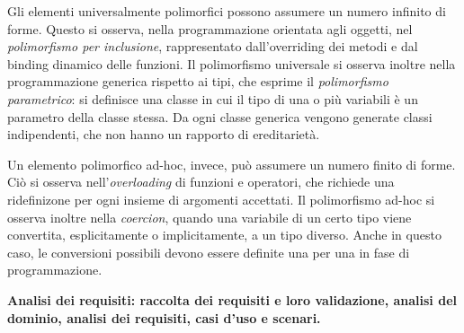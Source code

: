 \documentclass[answers, a4paper, 11pt]{exam}
\begin{document}
\begin{questions}
\begin{parts}
\begin{solution}
Gli elementi universalmente polimorfici possono assumere un numero infinito di forme. 
Questo si osserva, nella programmazione orientata agli oggetti, nel \textit{polimorfismo per inclusione}, rappresentato dall'overriding dei metodi e dal binding dinamico delle funzioni.
Il polimorfismo universale si osserva inoltre nella programmazione generica rispetto ai tipi, che esprime il \textit{polimorfismo parametrico}: si definisce una classe in cui il tipo di una o più variabili è un parametro della classe stessa.
Da ogni classe generica vengono generate classi indipendenti, che non hanno un rapporto di ereditarietà. 

Un elemento polimorfico ad-hoc, invece, può assumere un numero finito di forme.
Ciò si osserva nell'\textit{overloading} di funzioni e operatori, che richiede una ridefinizone per ogni insieme di argomenti accettati.
Il polimorfismo ad-hoc si osserva inoltre nella \textit{coercion}, quando una variabile di un certo tipo viene convertita, esplicitamente o implicitamente, a un tipo diverso.
Anche in questo caso, le conversioni possibili devono essere definite una per una in fase di programmazione.
\end{solution}

\end{parts}

\question \textbf{Analisi dei requisiti: raccolta dei requisiti e loro validazione, analisi del dominio, analisi dei requisiti, casi d'uso e scenari.}
\begin{parts}

\end{parts}
\end{questions}
\end{document}
